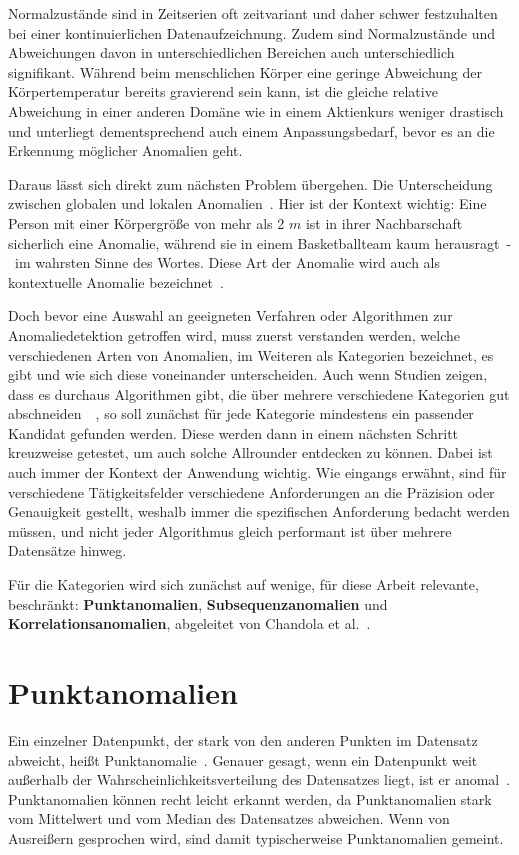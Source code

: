 Normalzustände sind in Zeitserien oft zeitvariant und daher schwer festzuhalten bei einer kontinuierlichen Datenaufzeichnung.
Zudem sind Normalzustände und Abweichungen davon in unterschiedlichen Bereichen auch unterschiedlich signifikant. Während beim
menschlichen Körper eine geringe Abweichung der Körpertemperatur bereits gravierend sein kann, ist die gleiche relative Abweichung
in einer anderen Domäne wie in einem Aktienkurs weniger drastisch und unterliegt dementsprechend auch einem Anpassungsbedarf, bevor
es an die Erkennung möglicher Anomalien geht.

Daraus lässt sich direkt zum nächsten Problem übergehen. Die Unterscheidung zwischen globalen und lokalen Anomalien~\cite{Breunig2000}.
Hier ist der Kontext wichtig: Eine Person mit einer Körpergröße von mehr als 2 $m$ ist in ihrer Nachbarschaft sicherlich eine Anomalie,
während sie in einem Basketballteam kaum herausragt~-~im wahrsten Sinne des Wortes. Diese Art der Anomalie wird auch als kontextuelle
Anomalie bezeichnet~\Cite[S.~12]{Wenig2024}.

Doch bevor eine Auswahl an geeigneten Verfahren oder Algorithmen zur Anomaliedetektion getroffen wird, muss zuerst verstanden werden,
welche verschiedenen Arten von Anomalien, im Weiteren als Kategorien bezeichnet, es gibt und wie sich diese voneinander unterscheiden.
Auch wenn Studien zeigen, dass es durchaus Algorithmen gibt, die über mehrere verschiedene Kategorien gut
abschneiden~\cite[S.~30~-~31]{Wenig2024}~\cite{Schmidl2022}, so soll zunächst für jede Kategorie mindestens ein passender Kandidat
gefunden werden. Diese werden dann in einem nächsten Schritt kreuzweise getestet, um auch solche Allrounder entdecken zu können. Dabei
ist auch immer der Kontext der Anwendung wichtig. Wie eingangs erwähnt, sind für verschiedene Tätigkeitsfelder verschiedene
Anforderungen an die Präzision oder Genauigkeit gestellt, weshalb immer die spezifischen Anforderung bedacht werden müssen, und nicht
jeder Algorithmus gleich performant ist über mehrere Datensätze hinweg.

Für die Kategorien wird sich zunächst auf wenige, für diese Arbeit relevante, beschränkt: \textbf{Punkt\-anomalien},
\textbf{Subsequenzanomalien} und \textbf{Korrelationsanomalien}, abgeleitet von Chandola et al.~\cite{Chandola2009}.

\section{Punktanomalien}
Ein einzelner Datenpunkt, der stark von den anderen Punkten im Datensatz abweicht, heißt Punkt\-anomalie~\cite{Chandola2009}. Genauer
gesagt, wenn ein Datenpunkt weit außerhalb der Wahrscheinlichkeitsverteilung des Datensatzes liegt, ist er anomal~\Cite[Kap.~10]{Tan2014}.
Punktanomalien können recht leicht erkannt werden, da Punktanomalien stark vom Mittelwert und vom Median des Datensatzes abweichen. Wenn
von Ausreißern gesprochen wird, sind damit typischerweise Punktanomalien gemeint.

